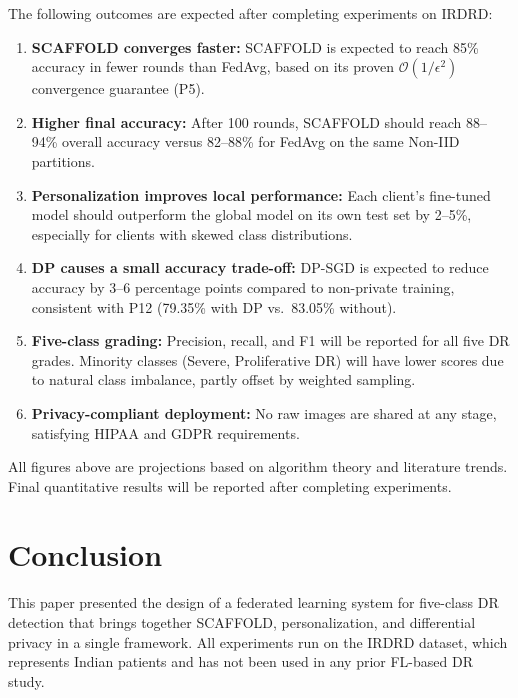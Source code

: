 \documentclass[12pt, a4paper]{article}
\begin{document}
The following outcomes are expected after completing experiments on IRDRD:

\begin{enumerate}
  \item \textbf{SCAFFOLD converges faster:} SCAFFOLD is expected to reach 85\% accuracy in fewer rounds than FedAvg, based on its proven $\mathcal{O}(1/\epsilon^2)$ convergence guarantee (P5).
  \item \textbf{Higher final accuracy:} After 100 rounds, SCAFFOLD should reach 88--94\% overall accuracy versus 82--88\% for FedAvg on the same Non-IID partitions.
  \item \textbf{Personalization improves local performance:} Each client's fine-tuned model should outperform the global model on its own test set by 2--5\%, especially for clients with skewed class distributions.
  \item \textbf{DP causes a small accuracy trade-off:} DP-SGD is expected to reduce accuracy by 3--6 percentage points compared to non-private training, consistent with P12 (79.35\% with DP vs.\ 83.05\% without).
  \item \textbf{Five-class grading:} Precision, recall, and F1 will be reported for all five DR grades. Minority classes (Severe, Proliferative DR) will have lower scores due to natural class imbalance, partly offset by weighted sampling.
  \item \textbf{Privacy-compliant deployment:} No raw images are shared at any stage, satisfying HIPAA and GDPR requirements.
\end{enumerate}

\noindent
All figures above are projections based on algorithm theory and literature trends. Final quantitative results will be reported after completing experiments.

\section{Conclusion}

This paper presented the design of a federated learning system for five-class DR detection that brings together SCAFFOLD, personalization, and differential privacy in a single framework. All experiments run on the IRDRD dataset, which represents Indian patients and has not been used in any prior FL-based DR study.
\end{document}

